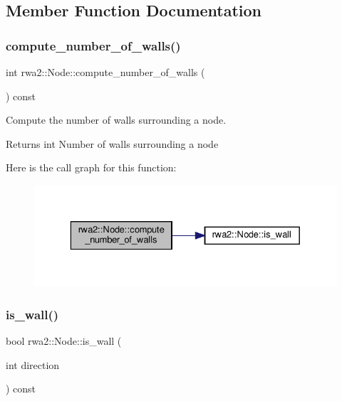 \subsection{Member Function Documentation}
\mbox{\label{classrwa2_1_1_node_a6057b0b97f6b815a57aad534cd021674}} 
\subsubsection{\texorpdfstring{compute\+\_\+number\+\_\+of\+\_\+walls()}{compute\_number\_of\_walls()}}
{\footnotesize\ttfamily int rwa2\+::\+Node\+::compute\+\_\+number\+\_\+of\+\_\+walls (\begin{DoxyParamCaption}{ }\end{DoxyParamCaption}) const}



Compute the number of walls surrounding a node. 

\begin{DoxyReturn}{Returns}
int Number of walls surrounding a node 
\end{DoxyReturn}
Here is the call graph for this function\+:\nopagebreak
\begin{figure}[H]
\begin{center}
\leavevmode
\includegraphics[width=329pt]{classrwa2_1_1_node_a6057b0b97f6b815a57aad534cd021674_cgraph}
\end{center}
\end{figure}
\mbox{\label{classrwa2_1_1_node_acd6ab64157b7b60bea708ddb52ddb1a8}} 
\subsubsection{\texorpdfstring{is\+\_\+wall()}{is\_wall()}}
{\footnotesize\ttfamily bool rwa2\+::\+Node\+::is\+\_\+wall (\begin{DoxyParamCaption}\item[{int}]{direction }\end{DoxyParamCaption}) const}



